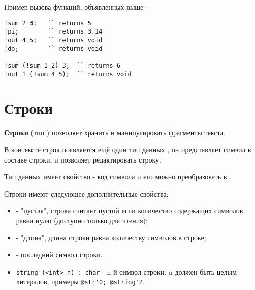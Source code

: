 \documentclass[a4paper, 14pt]{extarticle}
\newenvironment{icItems}
	{ \begin{itemize} [noitemsep,nolistsep] }
	{ \end{itemize} }
\begin{document}
\noindent Пример вызова функций, объявленных выше -
\begin{lstlisting}
!sum 2 3; 	`` returns 5
!pi; 		`` returns 3.14
!out 4 5; 	`` returns void
!do; 		`` returns void

!sum (!sum 1 2) 3;	`` returns 6
!out 1 (!sum 4 5);	`` returns void
\end{lstlisting}

\newpage
\section{Строки}

{\bf Строки} (тип \str) позволяет хранить и манипулировать фрагменты текста. 

В контексте строк появляется ещё один тип данных \chartype, он представляет символ в составе строки, и позволяет редактировать строку.

Тип данных \chartype имеет свойство  - код символа и его можно преобразовать в \str.

Строки имеют следующее дополнительные свойства:
\begin{icItems}
\item
	 - "пустая", строка считает пустой если количество содержащих символов равна нулю (доступно только для чтения);
\item
	 - "длина", длина строки равна количеству символов в строке;
\item
	 - последний символ строки.
\item
	\lstinline|string'(<int> n) : char| - n-й символ строки. n должен быть целым литералов, примеры \lstinline|@str'0; @string'2|.
\end{icItems}
\end{document}
